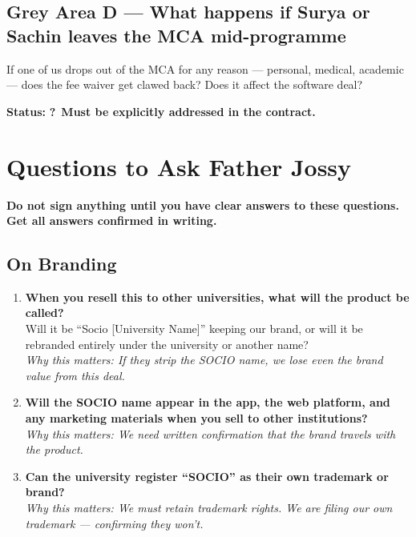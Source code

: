 \documentclass[12pt,a4paper]{article}
\newcommand{\ask}{\textcolor{amber}{\textbf{?}}}
\begin{document}
\subsection{Grey Area D — What happens if Surya or Sachin leaves the MCA mid-programme}

If one of us drops out of the MCA for any reason — personal, medical, academic — does the fee waiver get clawed back? Does it affect the software deal?

\textbf{Status:} \ask\ \textbf{Must be explicitly addressed in the contract.}

\newpage
\section{Questions to Ask Father Jossy}

\begin{questionbox}
\textbf{\color{amber} Do not sign anything until you have clear answers to these questions. Get all answers confirmed in writing.}
\end{questionbox}

\vspace{0.4cm}

\subsection{On Branding}

\begin{enumerate}[leftmargin=*, label=\textbf{Q\arabic*.}]

    \item \textbf{When you resell this to other universities, what will the product be called?}\\
    Will it be ``Socio [University Name]'' keeping our brand, or will it be rebranded entirely under the university or another name?\\
    \textit{Why this matters: If they strip the SOCIO name, we lose even the brand value from this deal.}

    \item \textbf{Will the SOCIO name appear in the app, the web platform, and any marketing materials when you sell to other institutions?}\\
    \textit{Why this matters: We need written confirmation that the brand travels with the product.}

    \item \textbf{Can the university register ``SOCIO'' as their own trademark or brand?}\\
    \textit{Why this matters: We must retain trademark rights. We are filing our own trademark — confirming they won't.}

\end{enumerate}
\end{document}
